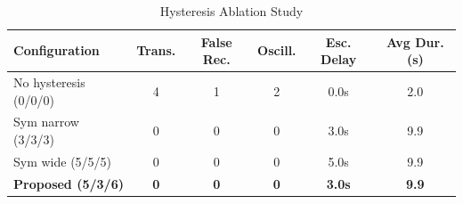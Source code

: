 \begin{table}[t]
\centering
\caption{Hysteresis Ablation Study}
\label{tab:ablation}
\begin{tabular}{lccccc}
\toprule
\textbf{Configuration} & \textbf{Trans.} & \textbf{False Rec.} & \textbf{Oscill.} & \textbf{Esc. Delay} & \textbf{Avg Dur. (s)} \\
\midrule
        No hysteresis (0/0/0) & 4 & 1 & 2 & 0.0s & 2.0 \\
        Sym narrow (3/3/3) & 0 & 0 & 0 & 3.0s & 9.9 \\
        Sym wide (5/5/5) & 0 & 0 & 0 & 5.0s & 9.9 \\
        \textbf{Proposed (5/3/6)} & \textbf{0} & \textbf{0} & \textbf{0} & \textbf{3.0s} & \textbf{9.9} \\
\bottomrule
\end{tabular}
\end{table}
